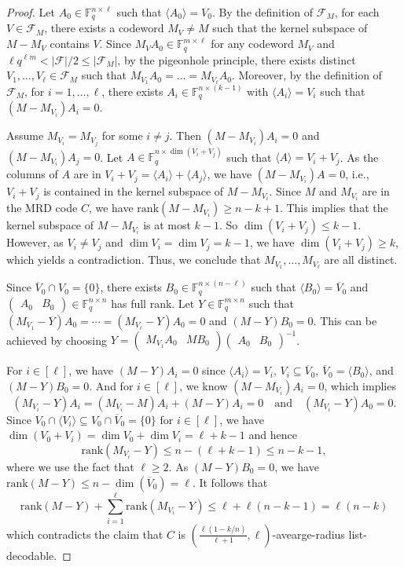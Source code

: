 \documentclass[11pt]{article}
\newif\ifmynotes
\newcommand{\ZGnote}[1]{\ifmynotes\textcolor{purple}{[Zeyu: #1]}\else\fi}
\theoremstyle{plain}
\theoremstyle{definition}
\theoremstyle{remark}
\newcommand{\F}{\mathbb{F}}
\newcommand{\rank}{\mathrm{rank}}
\def \mF {\mathcal{F}}
\begin{document}
\begin{proof}
Let $A_0\in \F_q^{n\times \ell}$ such that $\langle A_0\rangle =V_0$. 
By the definition of $\mathcal{F}_M$, for each $V\in\mathcal{F}_M$, there exists a codeword $M_V\neq M$ such that the kernel subspace of $M-M_V$ contains $V$.
Since $M_V A_0\in\F_q^{m\times \ell}$ for any codeword $M_V$ and $\ell q^{\ell m}<|\mF|/2\leq |\mF_M|$, by the pigeonhole principle, there exists distinct $V_1,\ldots,V_\ell\in \mathcal{F}_M$ 
such that $M_{V_1}A_0=\dots=M_{V_\ell}A_0$. Moreover, by the definition of $\mathcal{F}_M$, for $i=1,\dots,\ell$, there exists $A_i\in\F_q^{n\times (k-1)}$ with $\langle A_i\rangle=V_i$ such that $(M-M_{V_i})A_i=0$.


Assume $M_{V_i}=M_{V_j}$ for some $i\neq j$. Then $(M-M_{V_i})A_i=0$ and $(M-M_{V_i})A_j=0$.
Let $A\in\F_q^{n\times \dim(V_i+V_j)}$ such that $\langle A\rangle =V_i+V_j$.
As the columns of $A$ are in $V_i+V_j=\langle A_i\rangle+\langle A_j\rangle$, we have $(M-M_{V_i})A=0$, i.e., $V_i+V_j$ is contained in the kernel subspace of $M-M_{V_i}$. Since $M$ and $M_{V_i}$ are in the MRD code $C$, we have $\rank(M-M_{V_i})\geq n-k+1$. This implies that the kernel subspace of $M-M_{V_i}$ is at most $k-1$. So $\dim (V_i+V_j)\leq k-1$.
However, as $V_i\neq V_j$ and $\dim V_i=\dim V_j=k-1$, we have $\dim (V_i+V_j)\geq k$, which yields a contradiction. 
Thus, we conclude that $M_{V_1},\ldots,M_{V_{\ell}}$ are all distinct. 

Since $\overline{V}_0\cap V_0=\{0\}$, there exists $B_0\in \F_q^{n\times (n-\ell)}$ such that $\langle B_0\rangle =\overline{V}_0$ and $\begin{pmatrix} A_0 & B_0\end{pmatrix}\in \F_q^{n\times n}$ has full rank. Let $Y\in \F_q^{m\times n}$ such that $(M_{V_1}-Y)A_0=\cdots=(M_{V_{\ell}}-Y)A_0=0$ %
and $(M-Y)B_0=0$. This can be achieved by choosing $Y=\begin{pmatrix} M_{V_1}A_0 & MB_0\end{pmatrix}\begin{pmatrix} A_0 & B_0\end{pmatrix}^{-1}$.

For $i\in [\ell]$, we have $(M-Y) A_i=0$ since $\langle A_i\rangle=V_i$, $V_i\subseteq \overline{V}_0$, $\overline{V}_0=\langle B_0\rangle$, and $(M-Y)B_0=0$.
And for $i\in [\ell]$, we know $(M-M_{V_i})A_i=0$, which implies
\[
(M_{V_i}-Y)A_i=(M_{V_i}-M)A_i+(M-Y)A_i=0
\quad\text{and}\quad
(M_{V_i}-Y)A_0=0.\]
Since $V_0\cap \langle V_i\rangle\subseteq V_0\cap \overline{V}_0=\{0\}$ for $i\in [\ell]$, we have $\dim (V_0+V_i)=\dim V_0+\dim V_i=\ell+k-1$ and hence
\[
\rank(M_{V_i}-Y)\leq n-(\ell+k-1)\leq n-k-1,
\]
where we use the fact that $\ell\ge 2.$ As $(M-Y)B_0=0$, we have $\rank(M-Y)\leq n-\dim(\overline{V}_0)=\ell$. 
It follows that 
\[
\rank(M-Y)+\sum_{i=1}^{\ell}\rank(M_{V_i}-Y)\leq \ell+\ell(n-k-1)=\ell(n-k)
\]
which contradicts the claim that $C$ is $\left(\frac{\ell\left(1-k/n\right)}{\ell+1}, \ell\right)$-avearge-radius list-decodable.
\end{proof}

\clearpage 

\end{document}
